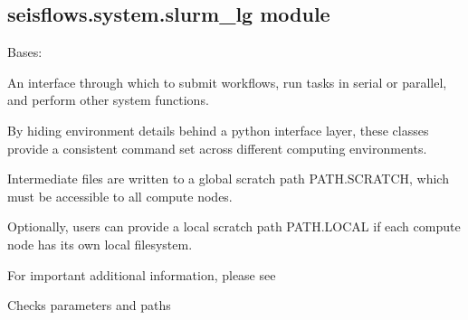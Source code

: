 \documentclass[letterpaper,10pt,english]{sphinxmanual}
\begin{document}
\subsection{seisflows.system.slurm\_lg module}
\label{\detokenize{ref/seisflows.system:module-seisflows.system.slurm_lg}}\label{\detokenize{ref/seisflows.system:seisflows-system-slurm-lg-module}}

\begin{fulllineitems}
\label{\detokenize{ref/seisflows.system:seisflows.system.slurm_lg.slurm_lg}}
Bases: {\hyperref[\detokenize{ref/seisflows.system:seisflows.system.base.base}]{}}

An interface through which to submit workflows, run tasks in serial or
parallel, and perform other system functions.

By hiding environment details behind a python interface layer, these
classes provide a consistent command set across different computing
environments.

Intermediate files are written to a global scratch path PATH.SCRATCH,
which must be accessible to all compute nodes.

Optionally, users can provide a local scratch path PATH.LOCAL if each
compute node has its own local filesystem.

For important additional information, please see

\begin{fulllineitems}
\label{\detokenize{ref/seisflows.system:seisflows.system.slurm_lg.slurm_lg.check}}
Checks parameters and paths

\end{fulllineitems}



\end{fulllineitems}
\end{document}
